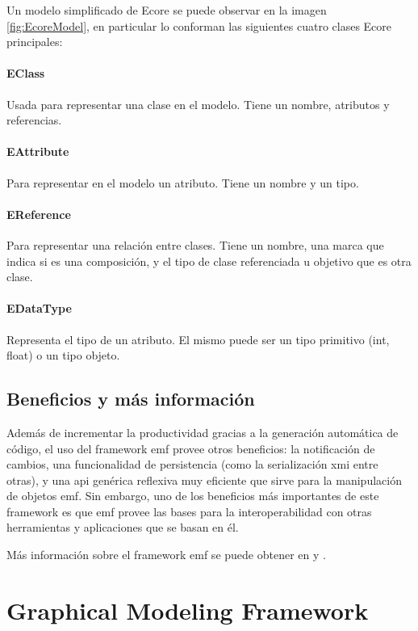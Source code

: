 \documentclass[a4paper,12pt,oneside,spanish]{book}
\begin{document}
Un modelo simplificado de Ecore se puede observar en la imagen \ref{fig:EcoreModel}, en particular lo conforman las siguientes cuatro clases Ecore principales:

\paragraph{EClass} Usada para representar una clase en el modelo. Tiene un nombre, atributos y referencias.

\paragraph{EAttribute} Para representar en el modelo un atributo. Tiene un nombre y un tipo.

\paragraph{EReference} Para representar una relación entre clases. Tiene un nombre, una marca que indica si es una composición, y el tipo de clase referenciada u objetivo que es otra clase.

\paragraph{EDataType} Representa el tipo de un atributo. El mismo puede ser un tipo primitivo (int, float) o un tipo objeto.


\subsection{Beneficios y más información}

Además de incrementar la productividad gracias a la generación automática de código, el uso del framework \gls{emf} provee otros beneficios: la notificación de cambios, una funcionalidad de persistencia (como la serialización \gls{xmi} entre otras), y una \gls{api} genérica reflexiva muy eficiente que sirve para la manipulación de objetos \gls{emf}. Sin embargo, uno de los beneficios más importantes de este framework es que \gls{emf} provee las bases para la interoperabilidad con otras herramientas y aplicaciones que se basan en él. 

Más información sobre el framework \gls{emf} se puede obtener en \cite{EMF} y \cite{EMFADG}.


\section{Graphical Modeling Framework}
\end{document}
